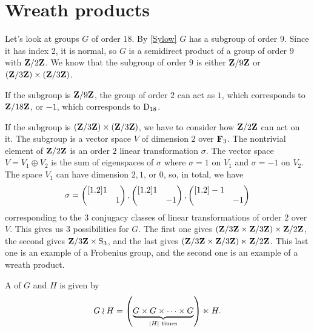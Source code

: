 \documentclass[11pt, oneside]{amsart}
\begin{document}
\section{Wreath products}
Let's look at groups $G$ of order $18$. By \cref{Sylow} $G$ has a subgroup of order $9$. Since it has index $2$, it is normal, so $G$ is a semidirect product of a group of order $9$ with $\mathbf Z/2\mathbf Z$. We know that the subgroup of order $9$ is either $\mathbf Z/9\mathbf Z$ or $(\mathbf Z / 3\mathbf Z) \times (\mathbf Z / 3\mathbf Z)$.

If the subgroup is $\mathbf Z / 9\mathbf Z$, the group of order $2$ can act as $1$, which corresponds to $\mathbf Z/18\mathbf Z$, or $-1$, which corresponds to $\operatorname{D}_{18}$.

 If the subgroup is $(\mathbf Z / 3\mathbf Z) \times (\mathbf Z / 3\mathbf Z)$, we have to consider how $\mathbf Z / 2\mathbf Z$ can act on it. The subgroup is a vector space $V$ of dimension $2$ over $\mathbf F_3$. The nontrivial element of $\mathbf Z/2\mathbf Z$ is an order $2$ linear transformation $\sigma$. The vector space $V = V_1 \oplus V_2$ is the sum of eigenspaces of $\sigma$ where $\sigma = 1$ on $V_1$ and $\sigma =-1$ on $V_2$. The space $V_1$ can have dimension $2,1$, or $0$, so, in total, we have
$$
\sigma = \begin{pmatrix} [ 1.2 ] 1 & \\ & 1\end{pmatrix},\begin{pmatrix} [ 1.2 ] 1 & \\ & -1\end{pmatrix},\begin{pmatrix} [ 1.2 ] -1 & \\ & -1\end{pmatrix}
$$ 
corresponding to the $3$ conjugacy classes of linear transformations of order $2$ over $V$. This gives us $3$ possibilities for $G$. The first one gives $(\mathbf Z / 3\mathbf Z \times \mathbf Z / 3\mathbf Z)\times \mathbf Z / 2\mathbf Z$, the second gives $\mathbf Z / 3\mathbf Z \times \operatorname{S}_3$, and the last gives $(\mathbf Z / 3\mathbf Z \times \mathbf Z / 3\mathbf Z)\ltimes \mathbf Z / 2\mathbf Z$. This last one is an example of a Frobenius group, and the second one is an example of a {wreath product}.
\begin{definition}
A  of $G$ and $H$ is given by
$$
G\wr H = \left (\underbrace{G \times G \times \cdots \times G}_{\left \lvert H \right \rvert \textrm{ times}}\right)\ltimes H.
$$
\end{definition}
\end{document}
